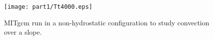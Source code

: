 \begin{figure}
  \texttt{[image: part1/Tt4000.eps]}
\caption{MITgcm run in a non-hydrostatic configuration
to study convection over a slope.}
\label{fig:convect-and-topo}
\end{figure}
